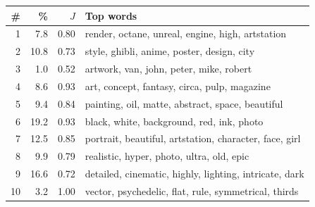 \begin{tabular}{rrrp{}}
\toprule
\# & \% & $J$ & Top words \\
\midrule
1 & 7.8 & 0.80 & render, octane, unreal, engine, high, artstation \\
2 & 10.8 & 0.73 & style, ghibli, anime, poster, design, city \\
3 & 1.0 & 0.52 & artwork, van, john, peter, mike, robert \\
4 & 8.6 & 0.93 & art, concept, fantasy, circa, pulp, magazine \\
5 & 9.4 & 0.84 & painting, oil, matte, abstract, space, beautiful \\
6 & 19.2 & 0.93 & black, white, background, red, ink, photo \\
7 & 12.5 & 0.85 & portrait, beautiful, artstation, character, face, girl \\
8 & 9.9 & 0.79 & realistic, hyper, photo, ultra, old, epic \\
9 & 16.6 & 0.72 & detailed, cinematic, highly, lighting, intricate, dark \\
10 & 3.2 & 1.00 & vector, psychedelic, flat, rule, symmetrical, thirds \\
\bottomrule
\end{tabular}

